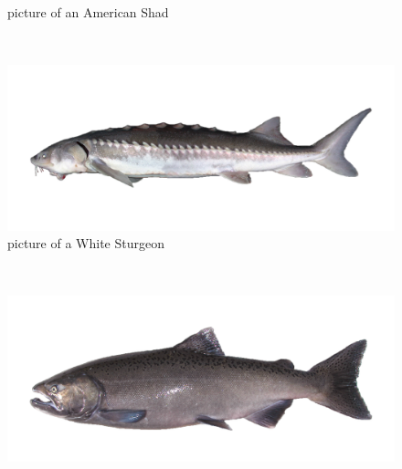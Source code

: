 \documentclass[
]{book}
\begin{document}
\begin{panel-grid}
\begin{columns-nocenter}
\begin{column800}
\begin{figure}
{}

\caption{picture of an American Shad}\label{fig:unnamed-chunk-127}
\end{figure}

\end{column800}

\begin{column40}

~

\end{column40}

\begin{column800}

\begin{figure}

{\centering \includegraphics[width=29.17in]{figures/white_sturgeon_adult} 

}

\caption{picture of a White Sturgeon}\label{fig:unnamed-chunk-128}
\end{figure}

\end{column800}

\begin{column40}

~

\end{column40}

\begin{column800}

\begin{figure}

{\centering \includegraphics[width=29.17in]{figures/chinook_salmon} 

}
\end{figure}
\end{column800}
\end{columns-nocenter}
\end{panel-grid}
\end{document}
